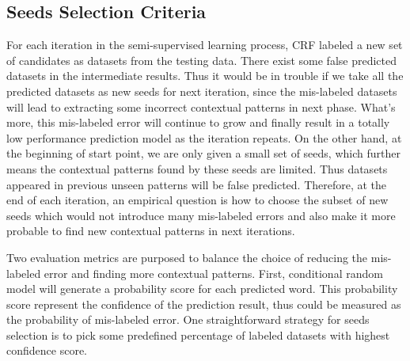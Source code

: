 \documentclass[10pt]{article}
\begin{document}
\subsection{Seeds Selection Criteria}
For each iteration in the semi-supervised learning process, CRF labeled a new set of candidates as datasets from the testing data. There exist some false predicted datasets in the intermediate results. Thus it would be in trouble if we take all the predicted datasets as new seeds for next iteration, since the mis-labeled datasets will lead to extracting some incorrect contextual patterns in next phase. What's more, this mis-labeled error will continue to grow and finally result in a totally low performance prediction model as the iteration repeats. On the other hand, at the beginning of start point, we are only given a small set of seeds, which further means the contextual patterns found by these seeds are limited. Thus datasets appeared in previous unseen patterns will be false predicted. Therefore, at the end of each iteration, an empirical question is how to choose the subset of new seeds which would not introduce many mis-labeled errors and also make it more probable to find new contextual patterns in next iterations. 

Two evaluation metrics are purposed to balance the choice of reducing the mis-labeled error and finding more contextual patterns. First, conditional random model will generate a probability score for each predicted word. This probability score represent the confidence of the prediction result, thus could be measured as the probability of mis-labeled error. One straightforward strategy for seeds selection is to pick some predefined percentage of labeled datasets with highest confidence score. 
\end{document}
